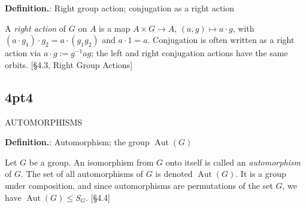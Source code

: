 \documentclass[12pt]{article}
\theoremstyle{definition}
\newcommand{\Aut}{\operatorname{Aut}}
\begin{document}
\newpage



\noindent\textbf{Definition.}: Right group action; conjugation as a right action

\newpage

A \emph{right action} of $G$ on $A$ is a map $A\times G\to A$, $(a,g)\mapsto a\cdot g$, with $(a\cdot g_1)\cdot g_2=a\cdot(g_1g_2)$ and $a\cdot 1=a$. Conjugation is often written as a right action via $a\cdot g:=g^{-1}ag$; the left and right conjugation actions have the same orbits. \hfill {\footnotesize [§4.3, Right Group Actions]}\\


\newpage

\subsection*{4pt4}

\newpage

AUTOMORPHISMS

\newpage


\noindent\textbf{Definition.}: Automorphism; the group $\Aut(G)$

\newpage

Let $G$ be a group. An isomorphism from $G$ onto itself is called an \emph{automorphism} of $G$. The set of all automorphisms of $G$ is denoted $\Aut(G)$. It is a group under composition, and since automorphisms are permutations of the set $G$, we have $\Aut(G)\le S_G$. \hfill {\footnotesize [§4.4]}\\

\end{document}
